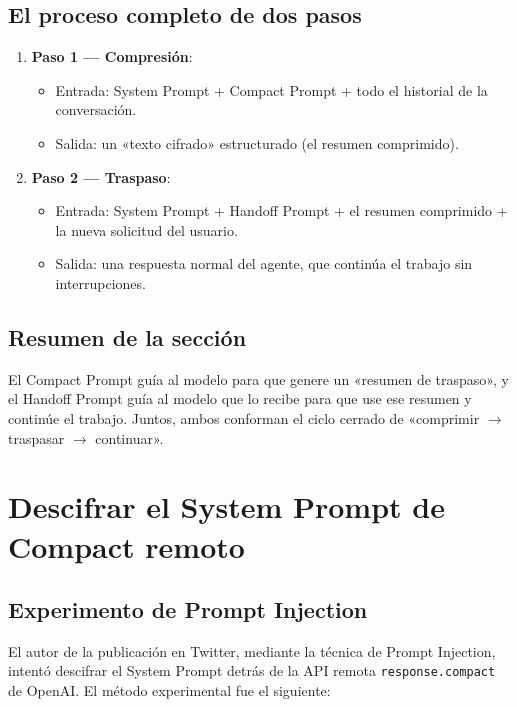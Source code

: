 \documentclass[a4paper]{article}
\begin{document}
\subsection{El proceso completo de dos pasos}

\begin{enumerate}
    \item \textbf{Paso 1 — Compresión}:
    \begin{itemize}
        \item Entrada: System Prompt + Compact Prompt + todo el historial de la conversación.
        \item Salida: un «texto cifrado» estructurado (el resumen comprimido).
    \end{itemize}
    \item \textbf{Paso 2 — Traspaso}:
    \begin{itemize}
        \item Entrada: System Prompt + Handoff Prompt + el resumen comprimido + la nueva solicitud del usuario.
        \item Salida: una respuesta normal del agente, que continúa el trabajo sin interrupciones.
    \end{itemize}
\end{enumerate}

\subsection{Resumen de la sección}

El Compact Prompt guía al modelo para que genere un «resumen de traspaso», y el Handoff Prompt guía al modelo que lo recibe para que use ese resumen y continúe el trabajo. Juntos, ambos conforman el ciclo cerrado de «comprimir $\rightarrow$ traspasar $\rightarrow$ continuar».

\section{Descifrar el System Prompt de Compact remoto}

\subsection{Experimento de Prompt Injection}

El autor de la publicación en Twitter, mediante la técnica de Prompt Injection, intentó descifrar el System Prompt detrás de la API remota \texttt{response.compact} de OpenAI. El método experimental fue el siguiente:
\end{document}
